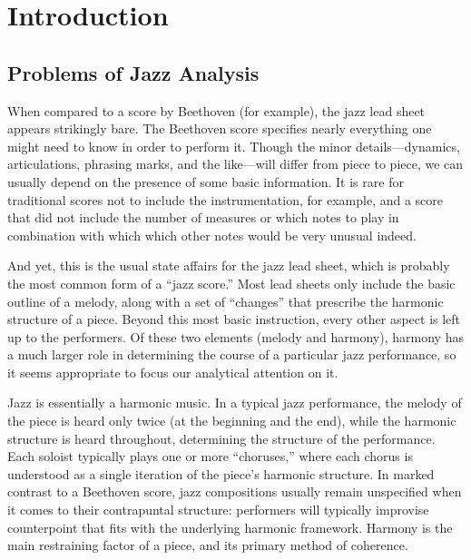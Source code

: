 
\chapter{Introduction}

\section{Problems of Jazz Analysis}
\label{sec:problems-jazz-analysis} %

When compared to a score by Beethoven (for example), the jazz lead sheet
appears strikingly bare. The Beethoven score specifies nearly everything one
might need to know in order to perform it. Though the minor details---dynamics,
articulations, phrasing marks, and the like---will differ from piece to piece,
we can usually depend on the presence of some basic information. It is rare
for traditional scores not to include the instrumentation, for example, and a
score that did not include the number of measures or which notes to play in
combination with which which other notes would be very unusual indeed.

And yet, this is the usual state affairs for the jazz lead sheet, which is
probably the most common form of a “jazz score.” Most lead sheets
only include the basic outline of a melody, along with a set of “changes” that
prescribe the harmonic structure of a piece. Beyond this most basic
instruction, every other aspect is left up to the performers.  Of these two
elements (melody and harmony), harmony has a much larger role in determining
the course of a particular jazz performance, so it seems appropriate to focus
our analytical attention on it.

Jazz is essentially a harmonic music. In a typical jazz performance, the melody
of the piece is heard only twice (at the beginning and the end), while the
harmonic structure is heard throughout, determining the structure of the
performance. Each soloist typically plays one or more “choruses,” where each
chorus is understood as a single iteration of the piece’s harmonic structure.
In marked contrast to a Beethoven score, jazz compositions usually remain
unspecified when it comes to their contrapuntal structure: performers will
typically improvise counterpoint that fits with the underlying harmonic
framework. Harmony is the main restraining factor of a piece, and its primary
method of coherence.

